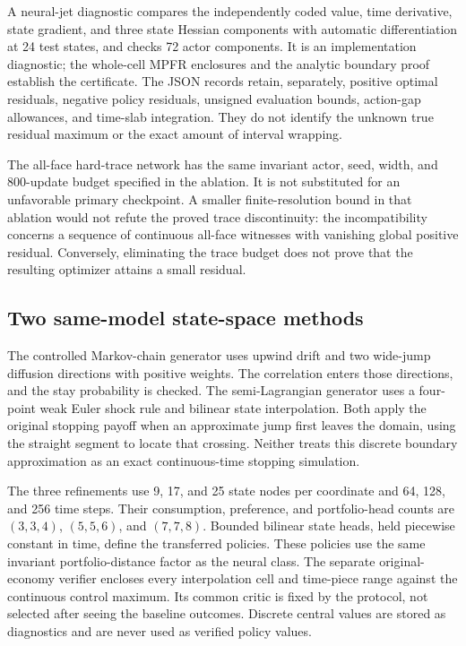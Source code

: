 A neural-jet diagnostic compares the independently coded value, time derivative, state gradient, and three state Hessian components with automatic differentiation at 24 test states, and checks 72 actor components. It is an implementation diagnostic; the whole-cell MPFR enclosures and the analytic boundary proof establish the certificate. The JSON records retain, separately, positive optimal residuals, negative policy residuals, unsigned evaluation bounds, action-gap allowances, and time-slab integration. They do not identify the unknown true residual maximum or the exact amount of interval wrapping.


The all-face hard-trace network has the same invariant actor, seed, width, and 800-update budget specified in the ablation. It is not substituted for an unfavorable primary checkpoint. A smaller finite-resolution bound in that ablation would not refute the proved trace discontinuity: the incompatibility concerns a sequence of continuous all-face witnesses with vanishing global positive residual. Conversely, eliminating the trace budget does not prove that the resulting optimizer attains a small residual.

\subsection{Two same-model state-space methods}
The controlled Markov-chain generator uses upwind drift and two wide-jump diffusion directions with positive weights. The correlation enters those directions, and the stay probability is checked. The semi-Lagrangian generator uses a four-point weak Euler shock rule and bilinear state interpolation. Both apply the original stopping payoff when an approximate jump first leaves the domain, using the straight segment to locate that crossing. Neither treats this discrete boundary approximation as an exact continuous-time stopping simulation.

The three refinements use 9, 17, and 25 state nodes per coordinate and 64, 128, and 256 time steps. Their consumption, preference, and portfolio-head counts are $(3,3,4)$, $(5,5,6)$, and $(7,7,8)$. Bounded bilinear state heads, held piecewise constant in time, define the transferred policies. These policies use the same invariant portfolio-distance factor as the neural class. The separate original-economy verifier encloses every interpolation cell and time-piece range against the continuous control maximum. Its common critic is fixed by the protocol, not selected after seeing the baseline outcomes. Discrete central values are stored as diagnostics and are never used as verified policy values.

